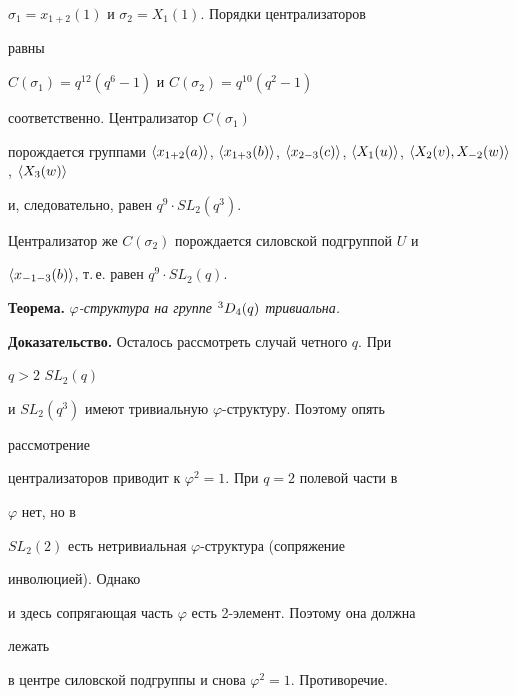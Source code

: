 $\sigma_1=x_{1+2}(1)$ и $\sigma_2=X_1(1)$. Порядки централизаторов 


равны  


$C(\sigma_1)=q^{12}(q^6-1)$ и $C(\sigma_2)=q^{10}(q^2-1)$ 


соответственно. Централизатор $C(\sigma_1)$ 


порождается группами $\la x_{1+2}(a)\ra$, $\la x_{1+3}(b)\ra$, $\la 


x_{2-3}(c)\ra$, $\la X_1(u)\ra$, $\la X_2(v),X_{-2}(w)\ra$, $\la 


X_3(w)\ra$ 


и, следовательно, равен $q^9\cdot SL_2(q^3)$. 


Централизатор же $C(\sigma_2)$ порождается силовской подгруппой $U$ и  


$\langle x_{-1-3}(b)\rangle$, т.\,е. равен $q^9\cdot SL_2(q)$. 


\medskip 


 


{\bf Теорема.} {\it $\varphi$-структура на группе ${}^3D_4(q)$ тривиальна.} 


\medskip 


 


{\bf Доказательство.} Осталось рассмотреть случай четного $q$. При 


$q>2$\; $SL_2(q)$ 


и $SL_2(q^3)$ имеют тривиальную $\varphi$-структуру. Поэтому опять 


рассмотрение  


централизаторов приводит к $\varphi^2=1$. При $q=2$ полевой части в 


$\varphi$ нет, но в  


$SL_2(2)$ есть нетривиальная $\varphi$-структура (сопряжение 


инволюцией). Однако  


и здесь сопрягающая часть $\varphi$ есть 2-элемент. Поэтому она должна 


лежать  


в центре силовской подгруппы и снова $\varphi^2=1$. Противоречие. 


 


 


